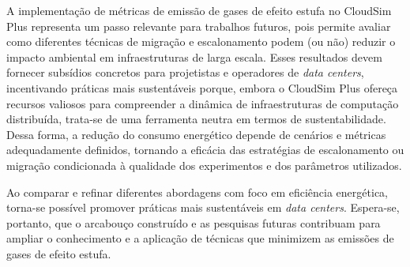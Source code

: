 \documentclass[12pt]{article}
\begin{document}
A implementação de métricas de emissão de gases de efeito estufa no CloudSim Plus representa um passo relevante para trabalhos futuros, pois permite avaliar como diferentes técnicas de migração e escalonamento podem (ou não) reduzir o impacto ambiental em infraestruturas de larga escala. Esses resultados devem fornecer subsídios concretos para projetistas e operadores de \textit{data centers}, incentivando práticas mais sustentáveis porque, embora o CloudSim Plus ofereça recursos valiosos para compreender a dinâmica de infraestruturas de computação distribuída, trata-se de uma ferramenta neutra em termos de sustentabilidade. Dessa forma, a redução do consumo energético depende de cenários e métricas adequadamente definidos, tornando a eficácia das estratégias de escalonamento ou migração condicionada à qualidade dos experimentos e dos parâmetros utilizados.

Ao comparar e refinar diferentes abordagens com foco em eficiência energética, torna-se possível promover práticas mais sustentáveis em \textit{data centers}. Espera-se, portanto, que o arcabouço construído e as pesquisas futuras contribuam para ampliar o conhecimento e a aplicação de técnicas que minimizem as emissões de gases de efeito estufa.

\renewcommand{\refname}{Referências}


\end{document}
